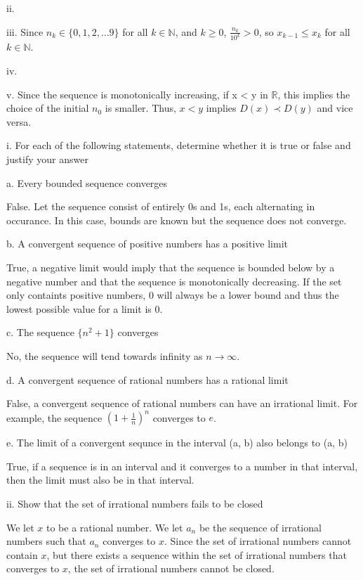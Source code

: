 \documentclass[addpoints]{exam}
\begin{document}
\begin{questions}
ii.

iii. Since $n_k \in \{0, 1, 2, \dots 9\}$ for all $k \in \mathbb{N}$, 
and $k \geq 0$, $\frac{n_k}{10^k} > 0$, so $x_{k-1} \leq x_k$ for all $k \in \mathbb{N}$.

iv. 

v. Since the sequence is monotonically increasing, if x < y in $\mathbb{R}$, this implies the 
choice of the initial $n_0$ is smaller. Thus, $x < y$ implies $D(x) \prec D(y)$ and vice versa.

\question 

i. For each of the following statements, determine whether it is true or false and justify your answer

a. Every bounded sequence converges

False. Let the sequence consist of entirely 0s and 1s, each alternating in occurance. In this case, 
bounds are known but the sequence does not converge.

b. A convergent sequence of positive numbers has a positive limit

True, a negative limit would imply that the sequence is bounded below by a negative number and that 
the sequence is monotonically decreasing. If the set only containts positive numbers, 0 will always 
be a lower bound and thus the lowest possible value for a limit is 0. 

c. The sequence $\{n^2 + 1\}$ converges

No, the sequence will tend towards infinity as $n \to \infty$.

d. A convergent sequence of rational numbers has a rational limit

False, a convergent sequence of rational numbers can have an irrational limit. For example, the sequence
$(1 + \frac{1}{n})^n$ converges to $e$.

e. The limit of a convergent sequnce in the interval (a, b) also belongs to (a, b)

True, if a sequence is in an interval and it converges to a number in that interval, then the limit must
also be in that interval.

ii. Show that the set of irrational numbers fails to be closed

We let $x$ to be a rational number. We let $a_n$ be the sequence of irrational numbers such that 
$a_n$ converges to $x$. Since the set of irrational numbers cannot contain $x$, but there exists a 
sequence within the set of irrational numbers that converges to $x$, the set of irrational numbers
cannot be closed.

\end{questions}
\end{document}
